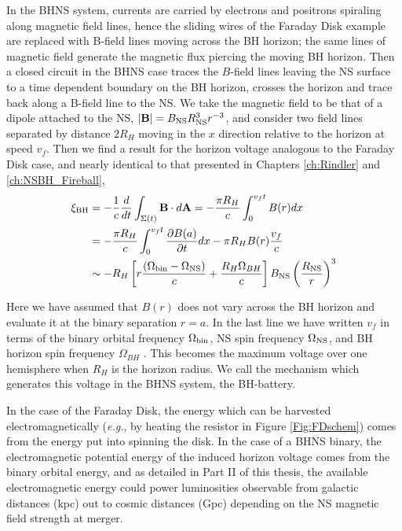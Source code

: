 In the BHNS system, currents are carried by electrons and positrons spiraling
along magnetic field lines, hence the sliding wires of the Faraday Disk
example are replaced with B-field lines moving across the BH horizon; the same
lines of magnetic field generate the magnetic flux piercing the moving BH
horizon. Then a closed circuit in the BHNS case traces the $B$-field lines
leaving the NS surface to a time dependent boundary on the BH horizon, crosses
the horizon and trace back along a B-field line to the NS. We take the magnetic field
to be that of a dipole attached to the NS, $|{\bf B}| = B_{\rm NS} R^3_{\rm NS}
r^{-3}$, and consider two field lines separated by distance $2R_H$ moving in the
$x$ direction relative to the horizon at speed $v_f$. Then we find a result
for the horizon voltage analogous to the Faraday Disk case, and nearly
identical to that presented in Chapters \ref{ch:Rindler} and \ref{ch:NSBH_Fireball},
\begin{align}
\xi_{\rm BH} &= - \frac{1}{c}\frac{d}{dt} \int_{\Sigma(t)}{{\bf B} \cdot d{\bf A}} =  - \frac{\pi R_H}{c} \int^{v_f t}_{0} {B(r) dx}  \\
&=  - \frac{\pi R_H}{c}  \int^{v_f t}_{0}{ \frac{\partial B(a)}{\partial t} dx}  - \pi R_H B(r) \frac{v_f}{c}    \\
& \sim    -R_H \left[r \frac{\left(\Omega_{\rm bin}  - \Omega_{\rm NS}\right)}{c} + \frac{R_H\Omega_{BH}}{c}\right] B_{\rm NS}  \left( \frac{R_{\rm NS}}{r} \right)^3
\end{align}

Here we have assumed that $B(r)$ does not vary across the BH horizon and
evaluate it at the binary separation $r=a$. In the last line we have written
$v_f$ in terms of the binary orbital frequency $\Omega_{\rm bin}$, NS spin
frequency $\Omega_{\rm NS}$, and BH horizon spin frequency $\Omega_{BH}$
\citep[see][]{McL:2011}. This becomes the maximum voltage over one hemisphere
when $R_H$ is the horizon radius. We call the mechanism which generates this voltage in the BHNS system, the BH-battery.

In the case of the Faraday Disk, the energy which can be harvested
electromagnetically (\textit{e.g.}, by heating the resistor in Figure
\ref{Fig:FDschem}) comes from the energy put into spinning
the disk. In the case of a BHNS binary, the electromagnetic potential energy
of the induced horizon voltage comes from the binary orbital energy, and as
detailed in Part II of this thesis, the available electromagnetic energy could
power luminosities observable from galactic distances (kpc) out to cosmic
distances (Gpc) depending on the NS magnetic field strength at merger.


